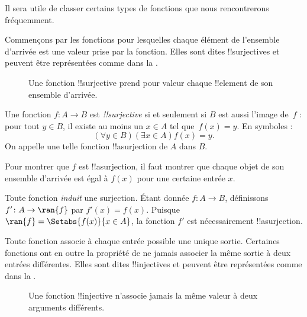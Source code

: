 \documentclass[../../../include/open-logic-section]{subfiles}
\begin{document}

\begin{explain}
Il sera utile de classer certains types de fonctions que nous rencontrerons
fréquemment.

Commençons par les fonctions pour lesquelles chaque élément de l’ensemble
d’arrivée est une valeur prise par la fonction. Elles sont dites
!!{surjective}s et peuvent être représentées comme dans la
.

\begin{figure}
  \caption{Une fonction !!{surjective} prend pour valeur chaque
    !!{element} de son ensemble d’arrivée.}
\end{figure}
\end{explain}

\begin{defn}
Une fonction $f \colon A \rightarrow B$ est \emph{!!{surjective}} si et
seulement si $B$ est aussi l’image de~$f$ : pour tout $y \in B$, il existe
au moins un $x \in A$ tel que~$f(x) = y$. En symboles :
\[
  (\forall y \in B)(\exists x \in A)f(x) = y.
\]
On appelle une telle fonction !!a{surjection} de $A$ dans $B$.
\end{defn}

\begin{explain}
Pour montrer que $f$ est !!a{surjection}, il faut montrer que chaque
objet de son ensemble d’arrivée est égal à $f(x)$ pour une certaine
entrée $x$.

Toute fonction \emph{induit} une surjection. Étant donnée
$f \colon A \to B$, définissons $f' \colon A \to \ran{f}$ par
$f'(x) = f(x)$. Puisque $\ran{f} = \Setabs{f(x)}{x \in A}$,
la fonction $f'$ est nécessairement !!a{surjection}.
%
\end{explain}

\begin{explain}
Toute fonction associe à chaque entrée possible une unique sortie.
Certaines fonctions ont en outre la propriété de ne jamais associer
la même sortie à deux entrées différentes. Elles sont dites
!!{injective}s et peuvent être représentées comme dans la
.
\begin{figure}
  \caption{Une fonction !!{injective} n’associe jamais la même valeur
    à deux arguments différents.}
\end{figure}
\end{explain}
\end{document}
